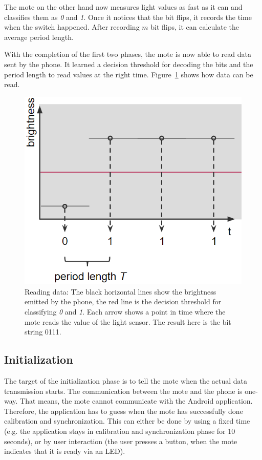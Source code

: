 \documentclass{ewsn-proc} %
\begin{document}
The mote on the other hand now measures light values as fast as it can and classifies them as \textit{0} and \textit{1}.
Once it notices that the bit flips, it records the time when the switch happened.
After recording $m$ bit flips, it can calculate the average period length.

With the completion of the first two phases, the mote is now able to read data sent by the phone.
It learned a decision threshold for decoding the bits and the period length to read values at the right time.
Figure~\ref{fig:read_a_bit} shows how data can be read.

\begin{figure}
	\centering
	\includegraphics[scale=.4]{images/reading_data.png}
	\caption{Reading data: The black horizontal lines show the brightness emitted by the phone, the red line is the decision threshold for classifying \textit{0} and \textit{1}. Each arrow shows a point in time where the mote reads the value of the light sensor. The result here is the bit string 0111.}
	\label{fig:read_a_bit}
\end{figure}

\subsection{Initialization}
\label{sub:initialization}

The target of the initialization phase is to tell the mote when the actual data transmission starts.
The communication between the mote and the phone is one-way.
That means, the mote cannot communicate with the Android application.
Therefore, the application has to guess when the mote has successfully done calibration and synchronization.
This can either be done by using a fixed time (e.g. the application stays in calibration and synchronization phase for 10 seconds), or by user interaction (the user presses a button, when the mote indicates that it is ready via an LED).
\end{document}
